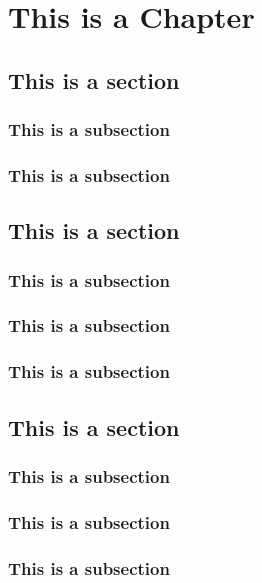 \documentclass[11pt,oneside]{book}
\begin{document}
\tableofcontents

% 

\chapter{This is a Chapter}

\section{This is a section}

\subsection{This is a subsection}
\subsection{This is a subsection}

\section{This is a section}

\subsection{This is a subsection}
\subsection{This is a subsection}


\newpage

\subsection{This is a subsection}

\section{This is a section}

\subsection{This is a subsection}
\subsection{This is a subsection}
\subsection{This is a subsection}
\end{document}
